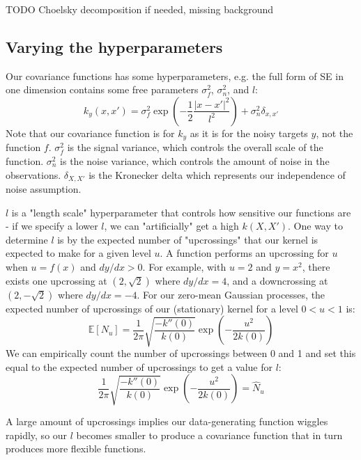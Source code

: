 \documentclass[10pt]{article}
\begin{document}
TODO Choelsky decomposition if needed, missing background


\subsection{Varying the hyperparameters \cite{gp-ml}}
Our covariance functions has some hyperparameters, e.g. the full form of SE in one dimension contains some free parameters $\sigma^2_f$, $\sigma^2_n$, and $l$:
\begin{equation*}
    k_y(x,x') = \sigma^2_f \exp\left(-\frac{1}{2}\frac{|x - x'|^2}{l^2}\right) + \sigma^2_n\delta_{x,x'}
\end{equation*}
Note that our covariance function is for $k_y$ as it is for the noisy targets $y$, not the function $f$. $\sigma^2_f$ is the signal variance, which controls the overall scale of the function. $\sigma^2_n$ is the noise variance, which controls the amount of noise in the observations. $\delta_{X,X'}$ is the Kronecker delta which represents our independence of noise assumption.

$l$ is a "length scale" hyperparameter that controls how sensitive our functions are - if we specify a lower $l$, we can "artificially" get a high $k(X,X')$. One way to determine $l$ is by the expected number of "upcrossings" that our kernel is expected to make for a given level $u$. A function performs an upcrossing for $u$ when $u = f(x)$ and $dy/dx > 0$. For example, with $u = 2$ and $y = x^2$, there exists one upcrossing at $(2, \sqrt{2})$ where $dy/dx = 4$, and a downcrossing at $(2, -\sqrt{2})$ where $dy/dx = -4$. For our zero-mean Gaussian processes, the expected number of upcrossings of our (stationary) kernel for a level $ 0 < u < 1$ is:
\begin{equation*}
    \mathbb{E}[N_u] = \frac{1}{2\pi} \sqrt{\frac{-k''(0)}{k(0)}} \exp \left(-\frac{u^2}{2k(0)}\right)
\end{equation*}
We can empirically count the number of upcrossings between 0 and 1 and set this equal to the expected number of upcrossings to get a value for $l$:
\begin{equation} \label{eq:general_l}
        \frac{1}{2\pi} \sqrt{\frac{-k''(0)}{k(0)}} \exp \left(-\frac{u^2}{2k(0)}\right) = \hat{N}_u
\end{equation}

A large amount of upcrossings implies our data-generating function wiggles rapidly, so our $l$ becomes smaller to produce a covariance function that in turn produces more flexible functions.
\end{document}
